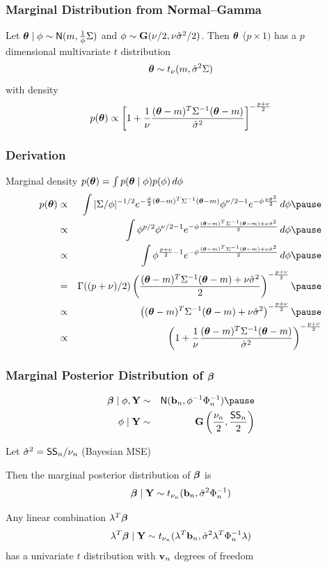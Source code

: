 \documentclass[]{beamer}
\begin{document}
\begin{frame}
  \frametitle{Marginal Distribution from Normal--Gamma }
  \begin{theorem}
    Let  $\boldsymbol{\theta} \mid \phi \sim \textsf{N}(m, \frac{1}{\phi} \Sigma)$ and $\phi \sim
    \mathbf{G}(\nu/2, \nu {\hat{\sigma}}^2/2)$. Then  $\boldsymbol{\theta}$ ($p \times 1)$ has a $p$
    dimensional multivariate $t$ distribution $$\boldsymbol{\theta} \sim t_\nu( m,
    {\hat{\sigma}}^2 \Sigma )$$ with density
$$p(\boldsymbol{\theta}) \propto  \left[ 1 + \frac{1}{\nu}  \frac{ (\boldsymbol{\theta} - m)^T
    \Sigma^{-1} (\boldsymbol{\theta} - m)}{{\hat{\sigma}}^2} \right]^{- \frac{p + \nu}{2}}$$
  \end{theorem}
\end{frame}

\begin{frame}
  \frametitle{Derivation}
Marginal density  $p(\boldsymbol{\theta}) = \int p(\boldsymbol{\theta} \mid \phi) p(\phi) \, d\phi$
\pause
\begin{eqnarray*}
  p(\tb) & \propto & \int |\Sigma/\phi|^{-1/2}
e^{- \frac{\phi}{2} (\tb - m)^T
    \Sigma^{-1} (\tb - m)}  \phi^{\nu/2 - 1} e^{- \phi \frac{\nu
      \shat}{2}}\, d \phi \pause \\
  & \propto & \int \phi^{p/2} \phi^{\nu/2 - 1}
e^{- \phi \frac{(\tb - m)^T
    \Sigma^{-1} (\tb - m)+  \nu
      \shat}{2}}\, d \phi \pause \\
 & \propto & \int \phi^{\frac{p +\nu}{2} - 1}
e^{- \phi \frac{(\tb - m)^T
    \Sigma^{-1} (\tb - m)+  \nu
      \shat}{2}} \, d \phi \pause \\
& = & \Gamma((p + \nu)/2 ) \left( \frac{(\tb - m)^T
    \Sigma^{-1} (\tb - m)+  \nu
      \shat}{2} \right)^{- \frac{p + \nu}{2}} \pause \\
& \propto &  \left( (\tb - m)^T
    \Sigma^{-1} (\tb - m)+  \nu
      \shat \right)^{- \frac{p + \nu}{2}} \pause \\
& \propto &  \left( 1 + \frac{1}{\nu}  \frac{(\tb - m)^T
    \Sigma^{-1} (\tb - m)}{\shat}
       \right)^{- \frac{p + \nu}{2}}
\end{eqnarray*}
\end{frame}

\begin{frame}
  \frametitle{Marginal Posterior Distribution of $\boldsymbol{\beta}$}
  \begin{eqnarray*}
\b \mid \phi, \Y  & \sim & \N( \bv_n, \phi^{-1} \Phi_n^{-1}) \pause \\
 \phi \mid \Y & \sim & \G\left(\frac{\nu_n}{2},  \frac{\SS_n}{ 2} \right)
  \end{eqnarray*}
\pause

Let ${\hat{\sigma}}^2 = \textsf{SS}_n/\nu_n$  (Bayesian MSE) \pause

Then the marginal posterior distribution of $\boldsymbol{\beta}$ is
$$
\boldsymbol{\beta}  \mid \mathbf{Y} \sim t_{\nu_n} (\mathbf{b}_n, {\hat{\sigma}}^2 \Phi_n^{-1})
$$ \pause


Any linear combination $\lambda^T\boldsymbol{\beta}$
$$\lambda^T\boldsymbol{\beta}  \mid \mathbf{Y} \sim t_{\nu_n}
(\lambda^T\mathbf{b}_n, {\hat{\sigma}}^2 \lambda^T\Phi_n^{-1}\lambda)$$ has a univariate
$t$ distribution with $\mathbf{v}_n$ degrees of freedom

\end{frame}
\end{document}
